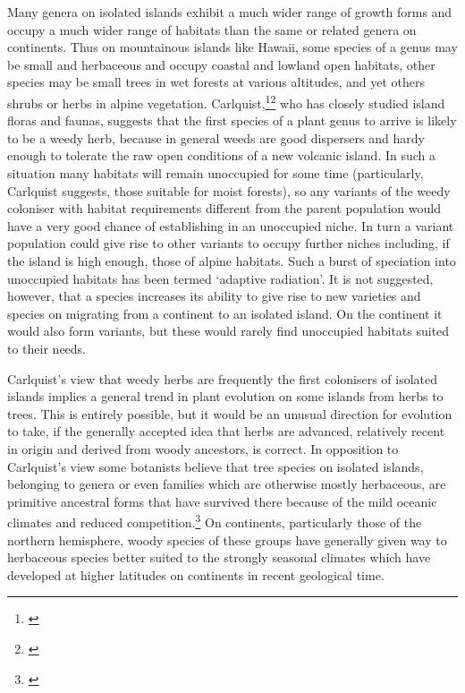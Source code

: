 Many genera on isolated islands exhibit a much wider range of growth forms and occupy a much wider range of habitats than the same or related genera on continents.
Thus on mountainous islands like Hawai{\okina}i, some species of a genus may be small and herbaceous and occupy coastal and lowland open habitats, other species may be small trees in wet forests at various altitudes, and yet others shrubs or herbs in alpine vegetation.
Carlquist,\footnote{\cite{carlquist1970hawaii}}\footnote{\cite{carlquist1965island}} who has closely studied island floras and faunas, suggests that the first species of a plant genus to arrive is likely to be a weedy herb, because in general weeds are good dispersers and hardy enough to tolerate the raw open conditions of a new volcanic island.
In such a situation many habitats will remain unoccupied for some time (particularly, Carlquist suggests, those suitable for moist forests), so any variants of the weedy coloniser with habitat requirements different from the parent population would have a very good chance of establishing in an unoccupied niche.
In turn a variant population could give rise to other variants to occupy further niches including, if the island is high enough, those of alpine habitats.
Such a burst of speciation into unoccupied habitats has been termed `adaptive radiation'.
It is not suggested, however, that a species increases its ability to give rise to new varieties and species on migrating from a continent to an isolated island.
On the continent it would also form variants, but these would rarely find unoccupied habitats suited to their needs.

Carlquist's view that weedy herbs are frequently the first colonisers of isolated islands implies a general trend in plant evolution on some islands from herbs to trees.
This is entirely possible, but it would be an unusual direction for evolution to take, if the generally accepted idea that herbs are advanced, relatively recent in origin and derived from woody ancestors, is correct.
In opposition to Carlquist's view some botanists believe that tree species on isolated islands, belonging to genera or even families which are otherwise mostly herbaceous, are primitive ancestral forms that have survived there because of the mild oceanic climates and reduced competition.\footnote{\cite{mabberley1979pachycaul}}
On continents, particularly those of the northern hemisphere, woody species of these groups have generally given way to herbaceous species better suited to the strongly seasonal climates which have developed at higher latitudes on continents in recent geological time.

